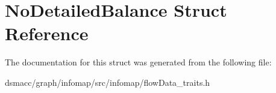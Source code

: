 \hypertarget{structNoDetailedBalance}{}\section{No\+Detailed\+Balance Struct Reference}
\label{structNoDetailedBalance}


The documentation for this struct was generated from the following file\+:\begin{DoxyCompactItemize}
\item 
dsmacc/graph/infomap/src/infomap/flow\+Data\+\_\+traits.\+h\end{DoxyCompactItemize}
